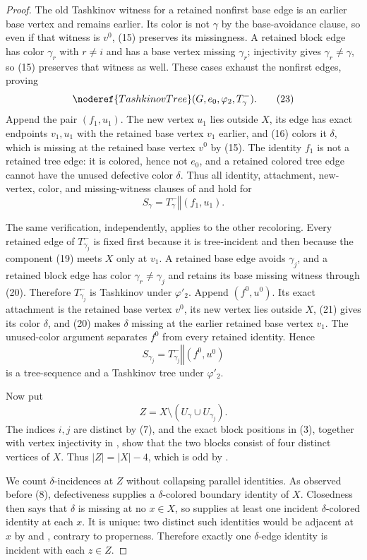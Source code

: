 \begin{proof}
The old Tashkinov witness for a retained nonfirst base edge is an earlier
base vertex and remains earlier.  Its color is not $\gamma$ by the
base-avoidance clause, so even if that witness is $v^0$, (15) preserves
its missingness.  A retained block edge has color $\gamma_r$ with
$r\ne i$ and has a base vertex missing $\gamma_r$; injectivity gives
$\gamma_r\ne\gamma$, so (15) preserves that witness as well.  These
cases exhaust the nonfirst edges, proving
\[
 \noderef{TashkinovTree}(G,e_0,\varphi_2,T^-_\gamma).         \tag{23}
\]
Append the pair $(f_1,u_1)$.  The new vertex $u_1$ lies outside $X$, its
edge has exact endpoints $v_1,u_1$ with the retained base vertex $v_1$
earlier, and (16) colors it $\delta$, which is missing at the retained
base vertex $v^0$ by (15).  The identity $f_1$ is not a retained tree
edge: it is colored, hence not $e_0$, and a retained colored tree edge
cannot have the unused defective color $\delta$.  Thus all identity,
attachment, new-vertex, color, and missing-witness clauses of
 and  hold for
\[
 S_\gamma=T^-_\gamma\mathbin{\Vert}(f_1,u_1).                \tag{24}
\]

The same verification, independently, applies to the other recoloring.
Every retained edge of $T^-_{\gamma_j}$ is fixed first because it is
tree-incident and then because the component (19) meets $X$ only at
$v_1$.  A retained base edge avoids $\gamma_j$, and a retained block edge
has color $\gamma_r\ne\gamma_j$ and retains its base missing witness
through (20).  Therefore $T^-_{\gamma_j}$ is Tashkinov under
$\varphi'_2$.  Append $(f^0,u^0)$.  Its exact attachment is the retained
base vertex $v^0$, its new vertex lies outside $X$, (21) gives its color
$\delta$, and (20) makes $\delta$ missing at the earlier retained base
vertex $v_1$.  The unused-color argument separates $f^0$ from every
retained identity.  Hence
\[
 S_{\gamma_j}=T^-_{\gamma_j}\mathbin{\Vert}(f^0,u^0)         \tag{25}
\]
is a tree-sequence and a Tashkinov tree under $\varphi'_2$.

Now put
\[
 Z=X\setminus(U_\gamma\cup U_{\gamma_j}).                   \tag{26}
\]
The indices $i,j$ are distinct by (7), and the exact block positions in
(3), together with vertex injectivity in , show
that the two blocks consist of four distinct vertices of $X$.  Thus
$|Z|=|X|-4$, which is odd by .

We count $\delta$-incidences at $Z$ without collapsing parallel
identities.  As observed before (8), defectiveness supplies a
$\delta$-colored boundary identity of $X$.  Closedness then says that
$\delta$ is missing at no $x\in X$, so
 supplies at least one incident
$\delta$-colored identity at each $x$.  It is unique: two distinct such
identities would be adjacent at $x$ by  and
, contrary to properness.  Therefore exactly one
$\delta$-edge identity is incident with each $z\in Z$.


\end{proof}
